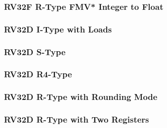 

\subsubsection[{\small RV32F R-Type FMV* Integer to Float}]{RV32F R-Type FMV* Integer to Float} \label{sec:format-RV32F-RTypeFMI2F}



\subsubsection[{\small RV32D I-Type with Loads}]{RV32D I-Type with Loads} \label{sec:format-RV32D-ILoad}



\subsubsection[{\small RV32D S-Type}]{RV32D S-Type} \label{sec:format-RV32D-SType}



\subsubsection[{\small RV32D R4-Type}]{RV32D R4-Type} \label{sec:format-RV32D-R4TypeRM}



\subsubsection[{\small RV32D R-Type with Rounding Mode}]{RV32D R-Type with Rounding Mode} \label{sec:format-RV32D-R3TypeRM}



\subsubsection[{\small RV32D R-Type with Two Registers}]{RV32D R-Type with Two Registers} \label{sec:format-RV32D-R2TypeRM}



